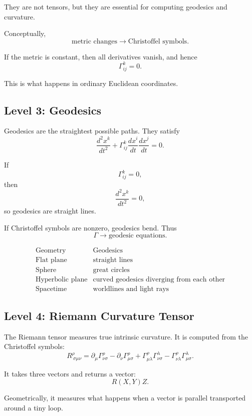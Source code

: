\documentclass[12pt,a4paper]{article}
\theoremstyle{notespace}
\begin{document}
They are not tensors, but they are essential for computing geodesics and curvature.

Conceptually,
\[
\boxed{
	\text{metric changes}
	\longrightarrow
	\text{Christoffel symbols}.
}
\]

If the metric is constant, then all derivatives vanish, and hence
\[
\Gamma^k_{ij}=0.
\]

This is what happens in ordinary Euclidean coordinates.

\subsection{Level 3: Geodesics}

Geodesics are the straightest possible paths. They satisfy
\[
\frac{d^2x^k}{dt^2}
+
\Gamma^k_{ij}
\frac{dx^i}{dt}
\frac{dx^j}{dt}
=0.
\]

If
\[
\Gamma^k_{ij}=0,
\]
then
\[
\frac{d^2x^k}{dt^2}=0,
\]
so geodesics are straight lines.

If Christoffel symbols are nonzero, geodesics bend. Thus
\[
\boxed{
	\Gamma
	\longrightarrow
	\text{geodesic equations}.
}
\]

\[
\begin{array}{c|c}
	\text{Geometry} & \text{Geodesics}\\
	\hline
	\text{Flat plane} & \text{straight lines}\\
	\text{Sphere} & \text{great circles}\\
	\text{Hyperbolic plane} & \text{curved geodesics diverging from each other}\\
	\text{Spacetime} & \text{worldlines and light rays}
\end{array}
\]

\subsection{Level 4: Riemann Curvature Tensor}

The Riemann tensor measures true intrinsic curvature. It is computed from the Christoffel symbols:
\[
R^\rho_{\ \sigma\mu\nu}
=
\partial_\mu\Gamma^\rho_{\nu\sigma}
-
\partial_\nu\Gamma^\rho_{\mu\sigma}
+
\Gamma^\rho_{\mu\lambda}\Gamma^\lambda_{\nu\sigma}
-
\Gamma^\rho_{\nu\lambda}\Gamma^\lambda_{\mu\sigma}.
\]

It takes three vectors and returns a vector:
\[
R(X,Y)Z.
\]

Geometrically, it measures what happens when a vector is parallel transported around a tiny loop.
\end{document}
